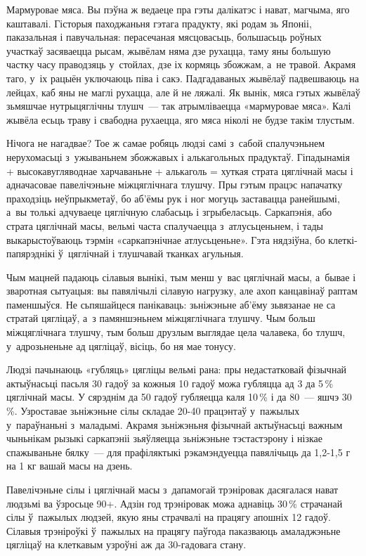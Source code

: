 Мармуровае мяса. Вы пэўна ж ведаеце пра гэты далікатэс і нават, магчыма, яго каштавалі. Гісторыя паходжаньня гэтага прадукту, які родам зь Японіі, паказальная і павучальная: перасечаная мясцовасьць, большасьць роўных участкаў засяваецца рысам, жывёлам няма дзе рухацца, таму яны большую частку часу праводзяць у~стойлах, дзе іх кормяць збожжам, а~не травой. Акрамя таго, у~іх рацыён уключаюць піва і сакэ. Падгадаваных жывёлаў падвешваюць на лейцах, каб яны не маглі рухацца, але й не ляжалі. Як вынік, мяса гэтых жывёлаў зьмяшчае нутрыцяглічны тлушч~--- так атрымліваецца «мармуровае мяса». Калі жывёла есьць траву і свабодна рухаецца, яго мяса ніколі не будзе такім тлустым.

Нічога не нагадвае? Тое ж самае робяць людзі самі з~сабой спалучэньнем нерухомасьці з~ужываньнем збожжавых і алькагольных прадуктаў. Гіпадынамія + высокавугляводнае харчаваньне + алькаголь = хуткая страта цяглічнай масы і адначасовае павелічэньне міжцяглічнага тлушчу. Пры гэтым працэс напачатку праходзіць неўпрыкметаў, бо аб'ёмы рук і ног могуць заставацца ранейшымі, а~вы толькі адчуваеце цяглічную слабасьць і згрыбеласьць. Саркапэнія, або страта цяглічнай масы, вельмі часта спалучаецца з~атлусьценьнем, і тады выкарыстоўваюць тэрмін «саркапэнічнае атлусьценьне». Гэта нядзіўна, бо клеткі-папярэднікі ў~цяглічнай і тлушчавай тканках агульныя.

Чым мацней падаюць сілавыя вынікі, тым менш у~вас цяглічнай масы, а~бывае і зваротная сытуацыя: вы павялічылі сілавую нагрузку, але ахоп канцавінаў раптам паменшыўся. Не сьпяшайцеся панікаваць: зьніжэньне аб'ёму зьвязанае не са стратай цягліцаў, а~з памяншэньнем міжцяглічнага тлушчу. Чым больш міжцяглічнага тлушчу, тым больш друзлым выглядае цела чалавека, бо тлушч, у~адрозьненьне ад цягліцаў, вісіць, бо ня мае тонусу.

Людзі пачынаюць «губляць» цягліцы вельмі рана: пры недастатковай фізычнай актыўнасьці пасьля 30 гадоў за кожныя 10 гадоў можа губляцца ад 3 да 5\,\% цяглічнай масы. У сярэднім да 50 гадоў губляецца каля 10\,\% і да 80~--- яшчэ 30\,\%. Узроставае зьніжэньне сілы складае 20-40 працэнтаў у~пажылых у~параўнаньні з~маладымі. Акрамя зьніжэньня фізычнай актыўнасьці важным чыньнікам рызыкі саркапэніі зьяўляецца зьніжэньне тэстастэрону і нізкае спажываньне бялку~--- для прафіляктыкі рэкамэндуецца павялічыць да 1,2-1,5 г на 1 кг вашай масы на дзень.

Павелічэньне сілы і цяглічнай масы з~дапамогай трэніровак дасягалася нават людзьмі ва ўзросьце 90+. Адзін год трэніровак можа аднавіць 30\,\% страчанай сілы ў~пажылых людзей, якую яны страчвалі на працягу апошніх 12 гадоў. Сілавыя трэніроўкі ў~пажылых на працягу паўгода паказваюць амаладжэньне цягліцаў на клеткавым узроўні аж да 30-гадовага стану.

